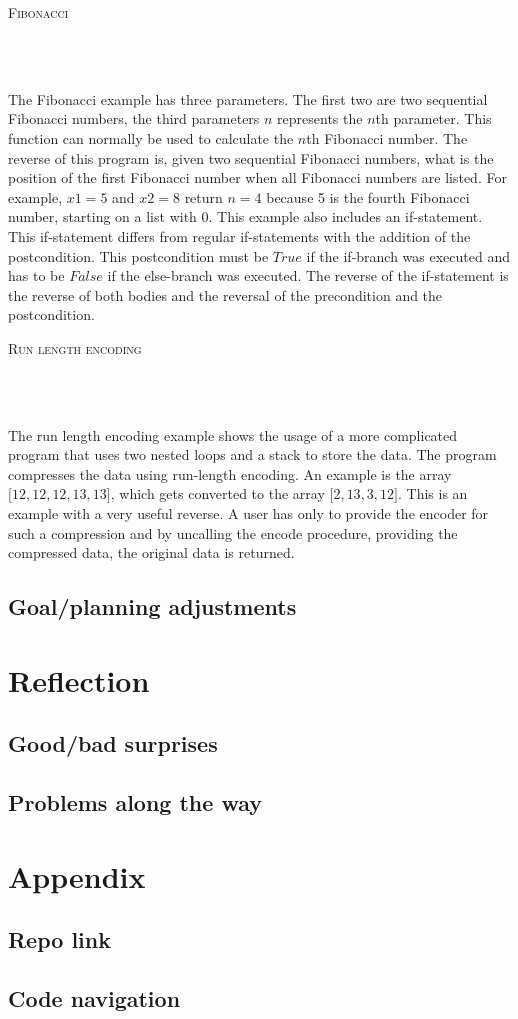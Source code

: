 \documentclass[12pt,a4paper]{article}
\newcommand{\code}[2]{
	\begin{center}
		\vspace{.5cm}
		\textsc{\small #1}\\
		\vspace{.5cm}
	\end{center}
	\begin{minipage}{.9\textwidth}
		\inputminted[frame=lines,framesep=1cm,baselinestretch=.8,linenos,fontsize=\footnotesize]
			{haskell}{code/#2.hs}
	\end{minipage}
}
\begin{document}
\code{Fibonacci}{fibonacci}	\\\\
The Fibonacci example has three parameters. The first two are two sequential Fibonacci numbers, the third parameters $n$ represents the $n$th parameter. This function can normally be used to calculate the $n$th Fibonacci number. The reverse of this program is, given two sequential Fibonacci numbers, what is the position of the first Fibonacci number when all Fibonacci numbers are listed. For example, $x1 = 5$ and $x2 = 8$ return $n=4$ because 5 is the fourth Fibonacci number, starting on a list with 0. This example also includes an if-statement. This if-statement differs from regular if-statements with the addition of the postcondition. This postcondition must be $True$ if the if-branch was executed and has to be $False$ if the else-branch was executed. The reverse of the if-statement is the reverse of both bodies and the reversal of the precondition and the postcondition.
\code{Run length encoding}{run-length-encoding}\\\\
The run length encoding example shows the usage of a more complicated program that uses two nested loops and a stack to store the data. The program compresses the data using run-length encoding. An example is the array $\lbrack 12, 12, 12, 13, 13 \rbrack$, which gets converted to the array $\lbrack 2, 13, 3, 12 \rbrack$. This is an example with a very useful reverse. A user has only to provide the encoder for such a compression and by uncalling the encode procedure, providing the compressed data, the original data is returned.
	\subsection{Goal/planning adjustments}
\section{Reflection}
	\subsection{Good/bad surprises}
	\subsection{Problems along the way}
\section{Appendix}
	\subsection{Repo link}
	\subsection{Code navigation}

\newpage


\end{document}
